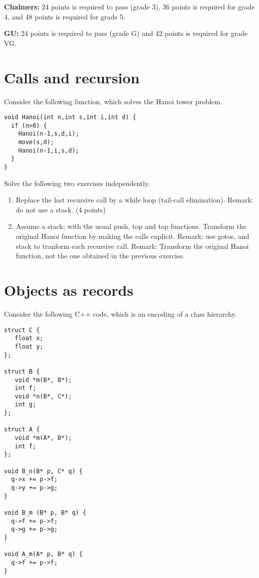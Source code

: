 \documentclass{article}
\begin{document}
  
\textbf{Chalmers:}
24 points is required to pass (grade 3), 36 points is required for
grade 4, and 48 points is required for grade 5. 

\textbf{GU:}
24 points is required to pass (grade G) and 42 points is
required for grade VG.

\section{Calls and recursion}

Consider the following function, which solves the Hanoi tower problem.

\begin{verbatim}
void Hanoi(int n,int s,int i,int d) {
  if (n>0) {
    Hanoi(n-1,s,d,i);
    move(s,d);
    Hanoi(n-1,i,s,d);
  }
}
\end{verbatim}

Solve the following two exercises independently.
\begin{enumerate}
\item Replace the last recursive call by a while loop (tail-call
  elimination). Remark: do not use a stack. (4 points)
\item Assume a stack; with the usual push, top and top
  functions. Transform the original Hanoi function by making the calls
  explicit. Remark: use gotos, and stack to tranform each recursive
  call. Remark: Transform the original Hanoi function, not the one
  obtained in the previous exercise.
\end{enumerate}


\newpage
\section{Objects as records}

Consider the following C++ code, which is an encoding of a class
hierarchy.
\begin{verbatim}
struct C {
   float x;
   float y;
};

struct B {
   void *m(B*, B*);
   int f;
   void *n(B*, C*);
   int g;
};

struct A {
   void *m(A*, B*);
   int f;
};

void B_n(B* p, C* q) {
  q->x += p->f;
  q->y += p->g;
}

void B_m (B* p, B* q) {
  q->f += p->f;
  q->g += p->g;
}

void A_m(A* p, B* q) {
  q->f += p->f;
}
\end{verbatim}
\end{document}
